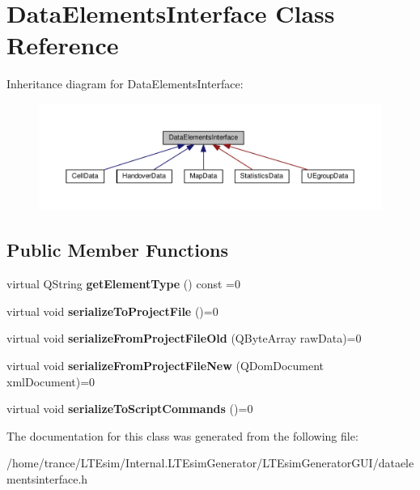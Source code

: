 \hypertarget{class_data_elements_interface}{}\section{Data\+Elements\+Interface Class Reference}
\label{class_data_elements_interface}


Inheritance diagram for Data\+Elements\+Interface\+:
\nopagebreak
\begin{figure}[H]
\begin{center}
\leavevmode
\includegraphics[width=350pt]{class_data_elements_interface__inherit__graph}
\end{center}
\end{figure}
\subsection*{Public Member Functions}
\begin{DoxyCompactItemize}
\item 
virtual Q\+String {\bfseries get\+Element\+Type} () const =0\hypertarget{class_data_elements_interface_ab71fa5312e02fb60413a3d4c716178f5}{}\label{class_data_elements_interface_ab71fa5312e02fb60413a3d4c716178f5}

\item 
virtual void {\bfseries serialize\+To\+Project\+File} ()=0\hypertarget{class_data_elements_interface_aee0663d36996c579b82ae05024176b51}{}\label{class_data_elements_interface_aee0663d36996c579b82ae05024176b51}

\item 
virtual void {\bfseries serialize\+From\+Project\+File\+Old} (Q\+Byte\+Array raw\+Data)=0\hypertarget{class_data_elements_interface_a97c737d424310e61839128253a1af964}{}\label{class_data_elements_interface_a97c737d424310e61839128253a1af964}

\item 
virtual void {\bfseries serialize\+From\+Project\+File\+New} (Q\+Dom\+Document xml\+Document)=0\hypertarget{class_data_elements_interface_aa1d9396933051fb710877078d47c695e}{}\label{class_data_elements_interface_aa1d9396933051fb710877078d47c695e}

\item 
virtual void {\bfseries serialize\+To\+Script\+Commands} ()=0\hypertarget{class_data_elements_interface_aee2fd04decdf32d9e7f98b8458108a24}{}\label{class_data_elements_interface_aee2fd04decdf32d9e7f98b8458108a24}

\end{DoxyCompactItemize}


The documentation for this class was generated from the following file\+:\begin{DoxyCompactItemize}
\item 
/home/trance/\+L\+T\+Esim/\+Internal.\+L\+T\+Esim\+Generator/\+L\+T\+Esim\+Generator\+G\+U\+I/dataelementsinterface.\+h\end{DoxyCompactItemize}
